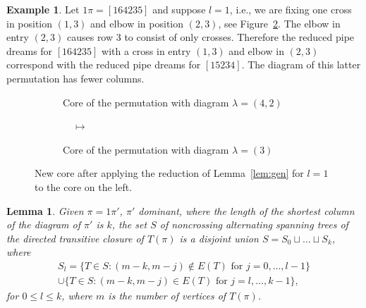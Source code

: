 \documentclass[10pt]{amsart}
\newtheorem{lemm}[theo]{Lemma}
\theoremstyle{definition}
\newtheorem{exam}[theo]{Example}
\numberwithin{equation}{section}
\newcommand{\lmp}[1]{\mathrel{\mathop{\longmapsto}^{#1}}}
\newcommand*\+{\smash{\lower2pt\hbox{\rlap{\vrule height14pt}}\raise2pt\hbox{\rlap{\hskip-3pt \vrule height.4pt depth0pt width14.7pt}}}}
\newcommand*\textcross{\ \smash{\lower4pt\hbox{\rlap{\hskip4.15pt\vrule height14pt}}\raise2.8pt\hbox{\rlap{\hskip-3pt \vrule height.4pt depth0pt width14.7pt}}}\hskip12.7pt}
\newcommand*\textelbow{\ \hskip.1pt\smash{\raise2.8pt\hbox{\co \hskip 4.15pt\rlap{\rlap{\char'005} \char'007}\lower6.8pt\rlap{\vrule height3.5pt}\raise3.6pt\rlap{\vrule height3.5pt}}\raise2.8pt\hbox{\rlap{\hskip-7.15pt \vrule height.4pt depth0pt width3.5pt}\rlap{\hskip4.05pt \vrule height.4pt depth0pt width3.5pt}}}\hskip8.7pt}
\begin{document}
\begin{exam} Let $1\pi=[164235]$ and suppose $l=1$, i.e., we are fixing one cross in position $(1,3)$ and elbow in position $(2,3)$, see Figure~\ref{ex:fixelb}. The elbow in entry $(2,3)$ causes row 3 to consist of only crosses. Therefore the reduced pipe dreams for $[164235]$ with a cross in entry $(1,3)$ and elbow in $(2,3)$ correspond with the reduced pipe dreams for $[15234]$. The diagram of this latter permutation has fewer columns.

\begin{figure}[h]
\centering
\begin{subfigure}[h]{0.35\textwidth}
\centering
{}
\caption{Core of the permutation with diagram $\lambda=(4,2)$}\label{fig:y equals x}
\end{subfigure}
\begin{subfigure}[h]{0.1\textwidth}
\centering $\quad\displaystyle{\lmp{}}\quad$
\end{subfigure}
\begin{subfigure}[h]{0.35\textwidth}
\centering
\vspace{0.7em}
\vspace{0.7em}
\caption{Core of the permutation with diagram $\lambda=(3)$}
\end{subfigure}
\caption{New core after applying the reduction of Lemma~\ref{lem:gen} for $l=1$ to the core on the left.} \label{ex:fixelb}
\end{figure}
\end{exam}

\begin{lemm}\label{lem:S}
Given $\pi=1\pi'$, $\pi'$ dominant, where the length of the shortest column of the diagram of $\pi'$ is $k$, the set $S$ of noncrossing alternating spanning trees of the directed transitive closure of $T(\pi)$ is a disjoint union $S=S_0\sqcup \dots \sqcup S_{k}$, where
\begin{multline}
S_l=\{T\in S : (m-k,m-j)\notin E(T) \text{ for } j=0,\dots,l-1\}\\
\cup \{T\in S : (m-k,m-j)\in E(T) \text{ for } j=l,\dots,k-1\},
\end{multline}
for $0\leq l\leq k$, where $m$ is the number of vertices of $T(\pi)$.
\end{lemm}
\end{document}
